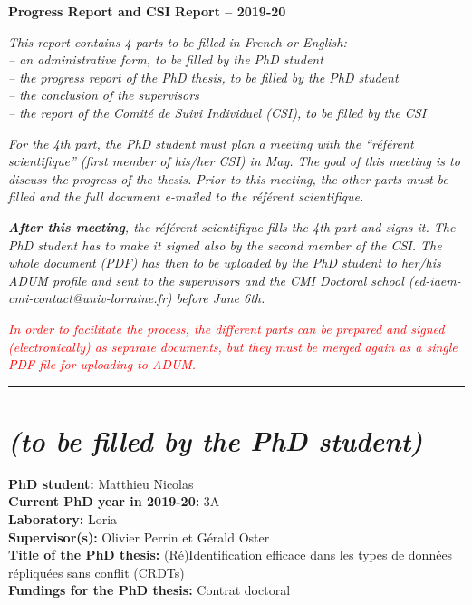 \documentclass[12pt]{article}
\newcommand{\commentaire}[1]{\small\textit{#1}}
\begin{document}
\hspace{-8.5mm} 

\bigskip

\centerline{\Large\textbf{Progress Report and CSI Report -- 2019-20}}
\bigskip
\bigskip

\commentaire{%
This report contains 4 parts to be filled in French or English:\\
  -- an administrative form, to be filled by the PhD student\\
  -- the progress report of the PhD thesis, to be filled by the PhD
  student\\
  -- the conclusion of the supervisors\\
  -- the report of the Comité de Suivi Individuel (CSI), to be
  filled by the CSI\\}

\commentaire{%
For the 4th part, the PhD student must plan a meeting with the
“référent scientifique” (first member of his/her CSI) in May. The
goal of this meeting is to discuss the progress of the
thesis. Prior to this meeting, the other parts must be filled and
the full document e-mailed to the référent scientifique.\\}

\commentaire{%
\textbf{After this meeting}, the référent scientifique fills the 4th
part and signs it.  The PhD student has to make it signed also by the
second member of the CSI.  The whole document (PDF) has then to be
uploaded by the PhD student to her/his ADUM profile and sent to the
supervisors and the CMI Doctoral school
(ed-iaem-cmi-contact@univ-lorraine.fr) before June 6th.\\}

\commentaire{%
\textcolor{red}{In order to facilitate the process, the different parts can be
prepared and signed (electronically) as separate documents, but
they must be merged again as a single PDF file for uploading to
ADUM.}}

\bigskip
\hrule

\section*{ \textit{\small (to be filled by the PhD student)}}

\noindent\textbf{PhD student:}
Matthieu Nicolas
\\
\noindent\textbf{Current PhD year in 2019-20:}
3A
\\
\noindent\textbf{Laboratory:}
Loria
\\
\noindent\textbf{Supervisor(s):}
Olivier Perrin et Gérald Oster
\\
\noindent\textbf{Title of the PhD thesis:}
(Ré)Identification efficace dans les types de données répliquées sans conflit (CRDTs)
\\
\noindent\textbf{Fundings for the PhD thesis:}
Contrat doctoral
\\
\end{document}
